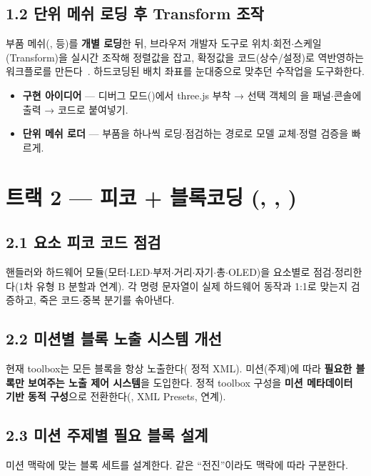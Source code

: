 \subsection{1.2 단위 메쉬 로딩 후 Transform 조작}
부품 메쉬(,  등)를 \textbf{개별 로딩}한
뒤, 브라우저 개발자 도구로 위치$\cdot$회전$\cdot$스케일(Transform)을 실시간 조작해 정렬값을
잡고, 확정값을 코드(상수/설정)로 역반영하는 워크플로를 만든다~\cite{threejs, gltf, meshopt}.
하드코딩된 배치 좌표를 눈대중으로 맞추던 수작업을 도구화한다.
\begin{itemize}
  \item \textbf{구현 아이디어} --- 디버그 모드()에서 three.js
   부착 → 선택 객체의 을 패널$\cdot$콘솔에
  출력 → 코드로 붙여넣기.
  \item \textbf{단위 메쉬 로더} --- 부품을 하나씩 로딩$\cdot$점검하는 경로로 모델 교체$\cdot$정렬
  검증을 빠르게.
\end{itemize}

\section{트랙 2 --- 피코 + 블록코딩 (, , )}

\subsection{2.1 요소 피코 코드 점검}
 핸들러와 하드웨어 모듈(모터$\cdot$LED$\cdot$부저$\cdot$거리$\cdot$자기$\cdot$총$\cdot$OLED)을 요소별로 점검$\cdot$정리한다(1차 유형 B 분할과 연계). 각 명령
문자열이 실제 하드웨어 동작과 1:1로 맞는지 검증하고, 죽은 코드$\cdot$중복 분기를
솎아낸다.

\subsection{2.2 미션별 블록 노출 시스템 개선}
현재 toolbox는 모든 블록을 항상 노출한다( 정적 XML). 미션(주제)에 따라
\textbf{필요한 블록만 보여주는 노출 제어 시스템}을 도입한다. 정적 toolbox 구성을
\textbf{미션 메타데이터 기반 동적 구성}으로 전환한다(, XML Presets,
 연계).

\subsection{2.3 미션 주제별 필요 블록 설계}
미션 맥락에 맞는 블록 세트를 설계한다. 같은 ``전진''이라도 맥락에 따라 구분한다.

